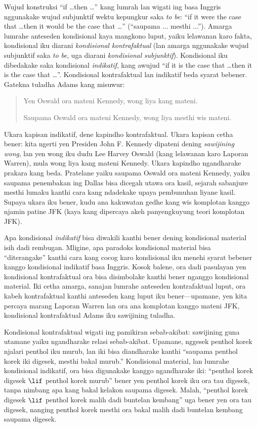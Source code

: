 \documentclass[../../../include/open-logic-section]{subfiles}
\begin{document}


Wujud konstruksi ``if \dots then \dots'' kang lumrah lan wigati
ing basa Inggris nggunakake wujud subjunktif wektu kepungkur saka
\emph{to be}: ``if it were the case that \dots then it would be the
case that \dots'' (``saupama ... mesthi ...''). Amarga lumrahe
anteseden kondisional kaya mangkono luput, yaiku lelawanan karo
fakta, kondisional iku diarani \emph{kondisional kontrafaktual}
(lan amarga nggunakake wujud subjunktif saka \emph{to be}, uga
diarani \emph{kondisional subjunktif}). Kondisional iku dibedakake
saka kondisional \emph{indikatif}, kang awujud ``if it is the case
that \dots then it is the case that \dots''. Kondisional
kontrafaktual lan indikatif beda syarat bebener. Gatekna tuladha
Adams kang misuwur:
\begin{quote}
  Yen Oswald ora mateni Kennedy, wong liya kang mateni.

  Saupama Oswald ora mateni Kennedy, wong liya mesthi wis mateni.
\end{quote}
Ukara kapisan indikatif, dene kapindho kontrafaktual. Ukara kapisan
cetha bener: kita ngerti yen Presiden John F. Kennedy dipateni
dening \emph{sawijining wong}, lan yen wong iku dudu Lee Harvey
Oswald (kang lelawanan karo Laporan Warren), mula wong liya kang
mateni Kennedy. Ukara kapindho ngandharake prakara kang beda.
Pratelane yaiku saupama Oswald ora mateni Kennedy, yaiku saupama
penembakan ing Dallas bisa dicegah utawa ora kasil, sejarah
sabanjure mesthi lumaku kanthi cara kang ndadekake upaya
pembunuhan liyane kasil. Supaya ukara iku bener, kudu ana
kakuwatan gedhe kang wis komplotan kanggo njamin patine JFK
(kaya kang dipercaya akeh panyengkuyung teori komplotan JFK).

Apa kondisional \emph{indikatif} bisa diwakili kanthi bener dening
kondisional material isih dadi rembugan. Mligine, apa paradoks
kondisional material bisa ``diterangake'' kanthi cara kang cocog
karo kondisional iku menehi syarat bebener kanggo kondisional
indikatif basa Inggris. Kosok balene, ora dadi pasulayan yen
kondisional kontrafaktual ora bisa disimbolake kanthi bener
nganggo kondisional material. Iki cetha amarga, sanajan lumrahe
anteseden kontrafaktual luput, ora kabeh kontrafaktual kanthi
anteseden kang luput iku bener---upamane, yen kita percaya marang
Laporan Warren lan ora ana komplotan kanggo mateni JFK,
kondisional kontrafaktual Adams iku sawijining tuladha.

Kondisional kontrafaktual wigati ing pamikiran sebab-akibat: sawijining
guna utamane yaiku ngandharake relasi sebab-akibat. Upamane,
nggesek penthol korek njalari penthol iku murub, lan iki bisa
diandharake kanthi ``saupama penthol korek iki digesek, mesthi
bakal murub.'' Kondisional material, lan lumrahe kondisional
indikatif, ora bisa digunakake kanggo ngandharake iki:
``penthol korek digesek $\lif$ penthol korek murub'' bener yen
penthol korek iku ora tau digesek, tanpa nimbang apa kang bakal
kelakon saupama digesek. Malah, ``penthol korek digesek $\lif$
penthol korek malih dadi buntelan kembang'' uga bener yen ora
tau digesek, nanging penthol korek mesthi ora bakal malih dadi
buntelan kembang saupama digesek.
\end{document}
